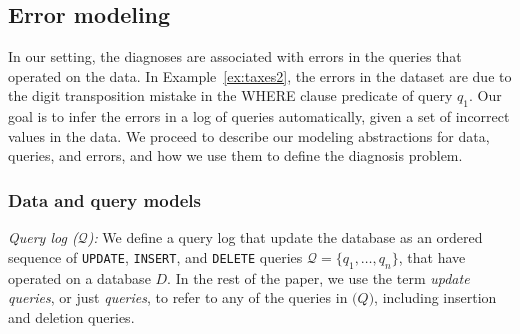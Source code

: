 

\subsection{Error modeling}
\label{sec:model}

In our setting, the diagnoses are associated with errors in the queries that
operated on the data. In Example~\ref{ex:taxes2}, the errors in the dataset
are due to the digit transposition mistake in the WHERE clause predicate of
query $q_1$. Our goal is to infer the errors in a log of queries
automatically, given a set of incorrect values in the data. We proceed to
describe our modeling abstractions for data, queries, and errors, and how we
use them to define the diagnosis problem.

\subsubsection*{Data and query models}
\label{sec:models}

\noindent
\emph{Query log ($\mathcal{Q}$):}
We define a query log that update the database 
as an ordered sequence of \texttt{UPDATE}, \texttt{INSERT}, and
\texttt{DELETE} queries $\mathcal{Q}=\{q_1,\dots,q_n\}$, that have
operated on a database $D$. In the rest of the paper, we use the term
\emph{update queries}, or just \emph{queries}, to refer to any of the queries in $\mathcal(Q)$,
including insertion and deletion queries.

